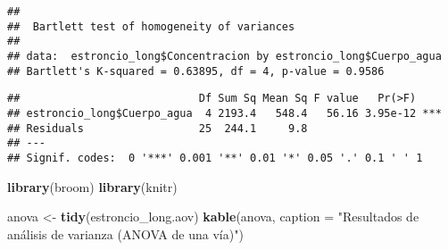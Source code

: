 \documentclass[
]{article}
\newenvironment{Shaded}{\begin{snugshade}}{\end{snugshade}}
\newcommand{\AttributeTok}[1]{\textcolor[rgb]{0.13,0.29,0.53}{#1}}
\newcommand{\CommentTok}[1]{\textcolor[rgb]{0.56,0.35,0.01}{\textit{#1}}}
\newcommand{\FunctionTok}[1]{\textcolor[rgb]{0.13,0.29,0.53}{\textbf{#1}}}
\newcommand{\NormalTok}[1]{#1}
\newcommand{\OtherTok}[1]{\textcolor[rgb]{0.56,0.35,0.01}{#1}}
\newcommand{\SpecialCharTok}[1]{\textcolor[rgb]{0.81,0.36,0.00}{\textbf{#1}}}
\newcommand{\StringTok}[1]{\textcolor[rgb]{0.31,0.60,0.02}{#1}}
\begin{document}
\begin{verbatim}
## 
##  Bartlett test of homogeneity of variances
## 
## data:  estroncio_long$Concentracion by estroncio_long$Cuerpo_agua
## Bartlett's K-squared = 0.63895, df = 4, p-value = 0.9586
\end{verbatim}

\begin{Shaded}
\end{Shaded}

\begin{verbatim}
##                            Df Sum Sq Mean Sq F value   Pr(>F)    
## estroncio_long$Cuerpo_agua  4 2193.4   548.4   56.16 3.95e-12 ***
## Residuals                  25  244.1     9.8                     
## ---
## Signif. codes:  0 '***' 0.001 '**' 0.01 '*' 0.05 '.' 0.1 ' ' 1
\end{verbatim}

\begin{Shaded}
\begin{Highlighting}[]
\FunctionTok{library}\NormalTok{(broom)}
\FunctionTok{library}\NormalTok{(knitr)  }

\NormalTok{anova }\OtherTok{\textless{}{-}} \FunctionTok{tidy}\NormalTok{(estroncio\_long.aov)}
\FunctionTok{kable}\NormalTok{(anova, }\AttributeTok{caption =} \StringTok{"Resultados de análisis de varianza (ANOVA de una vía)"}\NormalTok{)  }
\end{Highlighting}
\end{Shaded}
\end{document}
